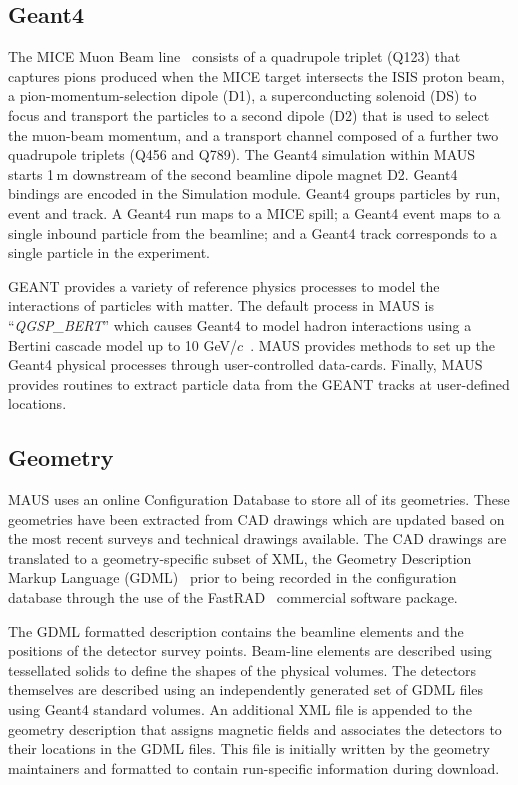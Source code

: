 \documentclass[11pt]{article}
\begin{document}
\subsection{Geant4}\label{sec:geant}
The MICE Muon Beam line~\cite{BeamlineJINST} consists of a quadrupole triplet (Q123) that captures pions produced when the MICE target intersects the ISIS proton beam, a pion-momentum-selection dipole (D1), a superconducting solenoid (DS) to focus and transport the particles to a second dipole (D2) that is used to select the muon-beam momentum, and a transport channel composed of a further two quadrupole triplets (Q456 and Q789). The Geant4 simulation within MAUS starts 1\,m downstream of the second beamline dipole magnet D2. Geant4 bindings are encoded in the Simulation module. Geant4 groups particles by run, event and track. A Geant4 run maps to a MICE spill; a Geant4 event maps to a single inbound particle from the beamline; and a Geant4 track corresponds to a single particle in the experiment.

GEANT provides a variety of reference physics processes to model the interactions of particles with matter. The default process in MAUS is ``\emph{QGSP\_BERT}'' which causes Geant4 to model hadron interactions using a Bertini cascade model up to 10 GeV/$c$~\cite{GEANT4HPhysics}. MAUS provides methods to set up the Geant4 physical processes through user-controlled data-cards. Finally, MAUS provides routines to extract particle data from the GEANT tracks at user-defined locations.

\subsection{Geometry}\label{sec:geo}

MAUS uses an online Configuration Database to store all of its
geometries. These geometries have been extracted from CAD drawings
which are  updated based on the most recent surveys and technical drawings
available. The CAD drawings are translated to a geometry-specific
subset of XML, the Geometry Description Markup Language (GDML)~\cite{GDML} prior
to being recorded in the configuration database through the use of the 
FastRAD~\cite{fastrad} commercial software package. 

The GDML formatted description contains the beamline elements and the positions of
the detector survey points. Beam-line elements are described using 
tessellated solids to define the shapes of the physical
volumes. The detectors themselves are described using an independently
generated set of GDML files using Geant4 standard volumes. An
additional XML file is appended to the geometry description that
assigns magnetic fields and associates the detectors to their
locations in the GDML files. This file is
initially written by the geometry maintainers and formatted to contain
run-specific information during download.
\end{document}
